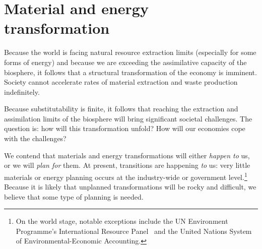 \section{Material and energy transformation}

Because the world is facing natural resource extraction limits
(especially for some forms of energy)
and because we are exceeding the assimilative capacity of the biosphere,
it follows that a structural transformation of the economy is imminent.
Society cannot accelerate rates of material extraction
and waste production indefinitely.

Because substitutability is finite, 
it follows that reaching the extraction and assimilation limits 
of the biosphere will bring significant societal challenges.
The question is: how will this transformation unfold?
How will our economies cope with the challenges?

We contend that materials and energy transformations will either  
\emph{happen to} us, or we will \emph{plan for} them.
At present,
transitions are happening \emph{to} us:
very little materials or energy planning occurs
at the industry-wide or government level.\footnote{On the world stage, 
	notable exceptions include the UN Environment Programme's 
	International Resource Panel~\cite{UNEP-IRP:aa}
	and the United Nations System of Environmental-Economic Accounting.\cite{UNSEEAWeb}
	}
Because it is likely that unplanned transformations will be rocky and difficult,
we believe that some type of planning is needed.

